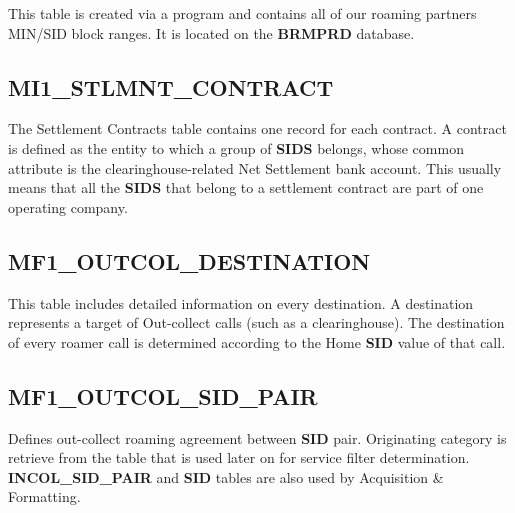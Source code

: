 \documentclass[12pt,twoside]{article}
\begin{document}
   This table is created via  a program and contains all of our roaming partners MIN/SID block ranges. It is located on the \textbf{BRMPRD} database.
\subsection{MI1\_STLMNT\_CONTRACT}
\label{sec-9-8}

   The Settlement Contracts table contains one record for each
   contract. A contract is defined as the entity to which a group of
   \textbf{SIDS} belongs, whose common attribute is the clearinghouse-related
   Net Settlement bank account. This usually means that all the \textbf{SIDS}
   that belong to a settlement contract are part of one operating
   company.
\subsection{MF1\_OUTCOL\_DESTINATION}
\label{sec-9-9}

  This table includes detailed information on every destination. A
  destination represents a target of Out-collect calls (such as a
  clearinghouse). The destination of every roamer call is determined
  according to the Home \textbf{SID} value of that call.
\subsection{MF1\_OUTCOL\_SID\_PAIR}
\label{sec-9-10}

   Defines out-collect roaming agreement between \textbf{SID} pair. Originating
   category is retrieve from the table that is used later on for
   service filter determination. \textbf{INCOL\_SID\_PAIR} and \textbf{SID} tables are also
   used by Acquisition \& Formatting.
\scriptsize
\end{document}
